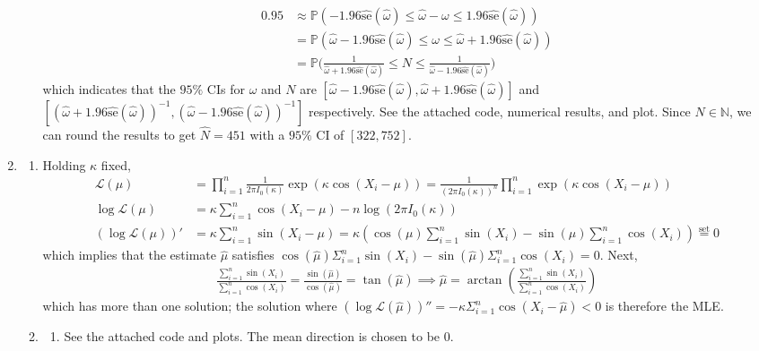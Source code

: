 \documentclass[12pt]{article}
\newcommand{\p}{\mathbb{P}}
\newcommand{\se}{\text{se}}
\newcommand{\h}[1]{\hat{#1}}
\begin{document}
\begin{enumerate}
\begin{enumerate}
\begin{align*}
            0.95 &\approx \p(-1.96\widehat{\se}(\h{\omega}) \leq \h{\omega}-\omega \leq 1.96\widehat{\se}(\h{\omega}))\\
            &= \p(\h{\omega} - 1.96\widehat{\se}(\h{\omega}) \leq \omega \leq \h{\omega} + 1.96\widehat{\se}(\h{\omega}))\\
            &= \p\Big(\frac{1}{\h{\omega} + 1.96\widehat{\se}(\h{\omega})} \leq N \leq \frac{1}{\h{\omega} - 1.96\widehat{\se}(\h{\omega})}\Big)
        \end{align*} which indicates that the $95\%$ CIs for $\omega$ and $N$ are $[\h{\omega} - 1.96\widehat{\se}(\h{\omega}), \h{\omega} + 1.96\widehat{\se}(\h{\omega})]$ and $[(\h{\omega} + 1.96\widehat{\se}(\h{\omega}))^{-1}, (\h{\omega} - 1.96\widehat{\se}(\h{\omega}))^{-1}]$ respectively. See the attached code, numerical results, and plot. Since $N\in\mathbb{N}$, we can round the results to get $\h N = 451$ with a $95\%$ CI of $[322, 752]$.
    \end{enumerate}
    \item
    \begin{enumerate}
        \item Holding $\kappa$ fixed, \begin{align*}
            \mathcal{L}(\mu) &= \prod_{i=1}^n \frac{1}{2\pi I_0(\kappa)} \exp(\kappa\cos(X_i-\mu)) = \frac{1}{(2\pi I_0(\kappa))^n} \prod_{i=1}^n \exp(\kappa\cos(X_i-\mu))\\
            \log\mathcal{L}(\mu) &= \kappa\sum_{i=1}^n\cos(X_i-\mu) - n\log(2\pi I_0(\kappa))\\
            (\log\mathcal{L}(\mu))' &= \kappa\sum_{i=1}^n\sin(X_i-\mu) = \kappa(\cos(\mu)\sum_{i=1}^n\sin(X_i)-\sin(\mu)\sum_{i=1}^n\cos(X_i)) \overset{\text{set}}{=} 0
        \end{align*} which implies that the estimate $\h{\mu}$ satisfies $\cos(\h{\mu})\Sigma_{i=1}^n\sin(X_i)-\sin(\h{\mu})\Sigma_{i=1}^n\cos(X_i)=0$. Next, \begin{align*}
            \frac{\sum_{i=1}^n\sin(X_i)}{\sum_{i=1}^n\cos(X_i)} = \frac{\sin(\h{\mu})}{\cos(\h{\mu})} = \tan(\h{\mu}) \implies \h{\mu} = \arctan(\frac{\sum_{i=1}^n\sin(X_i)}{\sum_{i=1}^n\cos(X_i)})
        \end{align*} which has more than one solution; the solution where $(\log\mathcal{L}(\h{\mu}))'' = -\kappa\Sigma_{i=1}^n\cos(X_i-\h{\mu}) < 0$ is therefore the MLE.
        \item \begin{enumerate}
            \item See the attached code and plots. The mean direction is chosen to be 0.

\end{enumerate}
\end{enumerate}
\end{enumerate}
\end{document}
